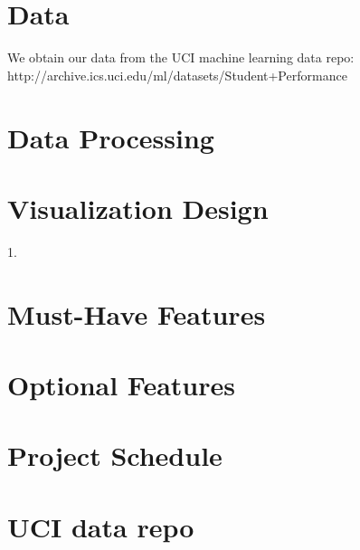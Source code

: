 \documentclass{article}
\begin{document}
\section{Data}
We obtain our data from the UCI machine learning data repo: \\
http://archive.ics.uci.edu/ml/datasets/Student+Performance
\section{Data Processing}
\section{Visualization Design}
1.
\section{Must-Have Features}
\section{Optional Features}
\section{Project Schedule}
\section{UCI data repo}
\end{document}
